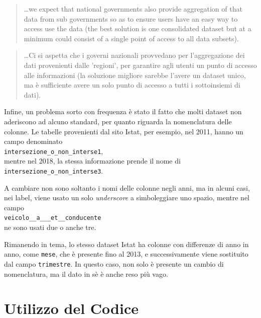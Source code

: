 \documentclass[a4paper,12pt]{report}
\newcommand{\columnstyle}[1]{\texttt{#1}}
\newcommand{\quotestyle}[1]{\textit{#1}}
\newcommand{\skipline}{\vspace{0.2in}}
\begin{document}
\begin{quotation}
    \dots we expect that national governments also provide aggregation 
    of that data from 
    sub governments so as to ensure users have an easy way to access use the data 
    (the best solution is one consolidated dataset but at a minimum could consist of a 
    single point of access to all data subsets).\cite{OPENDATAINDEX:1}
\end{quotation}

\begin{quotation}
    \dots Ci si aspetta che i governi nazionali provvedano per 
    l'aggregazione dei dati provenienti dalle 'regioni', per garantire agli utenti 
    un punto di accesso 
    alle informazioni (la soluzione migliore sarebbe l'avere un dataset unico, ma è sufficiente 
    avere un solo punto di accesso a tutti i sottoinsiemi di dati). 
\end{quotation}

\skipline
Infine, un problema sorto con frequenza è stato il fatto che 
molti dataset non aderiscono ad 
alcuno standard, per quanto riguarda la nomenclatura delle colonne. 
Le tabelle provenienti dal sito Istat, per esempio, nel 2011, hanno un campo denominato\\
\indent\columnstyle{intersezione\_o\_non\_interse1},\\
mentre nel 2018, la stessa informazione prende il nome di\\
\indent \columnstyle{intersezione\_o\_non\_interse3}.

A cambiare non sono soltanto i nomi delle colonne negli anni, 
ma in alcuni casi, nei label, viene usato un solo \quotestyle{underscore} a 
simboleggiare uno spazio, mentre nel campo\\
\indent\columnstyle{veicolo\_\_a\_\_\_et\_\_conducente}\\
ne sono usati due o anche tre. 

Rimanendo in tema, lo stesso dataset Istat ha colonne con differenze di anno in anno, 
come \columnstyle{mese}, che è presente fino al 2013, e successivamente viene 
sostituito dal campo \columnstyle{trimestre}. 
In questo caso, non solo è presente un cambio di nomenclatura, ma il dato in sè è 
anche reso più vago. 

\chapter{Utilizzo del Codice}
\end{document}

